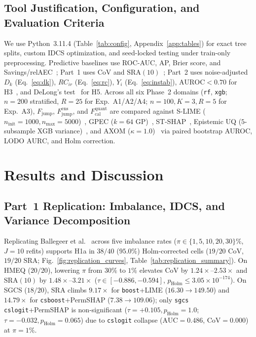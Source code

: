 \documentclass[conference]{IEEEtran}
\begin{document}
\subsection{Tool Justification, Configuration, and Evaluation Criteria}
We use Python~3.11.4 (Table~\ref{tab:config}, Appendix~\ref{app:tables}) for exact tree splits, custom IDCS optimization, and seed-locked testing under train-only preprocessing. Predictive baselines use ROC-AUC, AP, Brier score, and Savings/relAEC~\cite{ballegeer2025}; Part~1 uses $\mathrm{CoV}$ and $\mathrm{SRA}(10)$~\cite{ekstrom2019}; Part~2 uses noise-adjusted $D_k$ (Eq.~\eqref{eq:dk}), $RC_{ir}$ (Eq.~\eqref{eq:rc}), $Y_i$ (Eq.~\eqref{eq:instab}), $\mathrm{AUROC}<0.70$ for H3~\cite{hosmer2013}, and DeLong's test~\cite{delong1988} for H5. Across all six Phase~2 domains (\texttt{rf}, \texttt{xgb}; $n{=}200$ stratified, $R{=}25$ for Exp.~A1/A2/A4; $n{=}100, K{=}3, R{=}5$ for Exp.~A3), $F_{\mathrm{jump}}$, $F_{\mathrm{jump}}^{\mathrm{ens}}$, and $F_{\mathrm{cal}}^{\mathrm{quant}}$ are compared against S-LIME ($n_{\mathrm{init}}{=}1000, n_{\max}{=}5000$)~\cite{zhou2021}, GPEC ($k{=}64$ GP)~\cite{hill2024}, ST-SHAP~\cite{kelodjou2024}, Epistemic UQ ($5$-subsample XGB variance)~\cite{mikriukov2026}, and AXOM ($\kappa{=}1.0$)~\cite{pala2024} via paired bootstrap AUROC, LODO $\mathrm{AURC}$, and Holm correction.

\section{Results and Discussion}
\label{sec:results}

\subsection{Part~1 Replication: Imbalance, IDCS, and Variance Decomposition}
\label{sec:res_part1}
Replicating Ballegeer et al.~\cite{ballegeer2025} across five imbalance rates ($\pi \in \{1, 5, 10, 20, 30\}\%$, $J{=}10$ refits) supports H1a in $38/40$ ($95.0\%$) Holm-corrected cells ($19/20$ $\mathrm{CoV}$, $19/20$ $\mathrm{SRA}$; Fig.~\ref{fig:replication_curves}, Table~\ref{tab:replication_summary}). On HMEQ ($20/20$), lowering $\pi$ from $30\%$ to $1\%$ elevates $\mathrm{CoV}$ by $1.24\times$--$2.53\times$ and $\mathrm{SRA}(10)$ by $1.48\times$--$3.21\times$ ($\tau \in [-0.886, -0.594]$, $p_{\mathrm{Holm}} \le 3.05\times 10^{-174}$). On SGCS ($18/20$), $\mathrm{SRA}$ climbs $9.17\times$ for \texttt{boost}+LIME ($16.30{\to}149.50$) and $14.79\times$ for \texttt{csboost}+PermSHAP ($7.38{\to}109.06$); only \texttt{sgcs} \texttt{cslogit}+PermSHAP is non-significant ($\tau{=}{+}0.105, p_{\mathrm{Holm}}{=}1.0$; $\tau{=}{-}0.032, p_{\mathrm{Holm}}{=}0.065$) due to \texttt{cslogit} collapse ($\mathrm{AUC}{=}0.486$, $\mathrm{CoV}{=}0.000$) at $\pi{=}1\%$.
\end{document}
